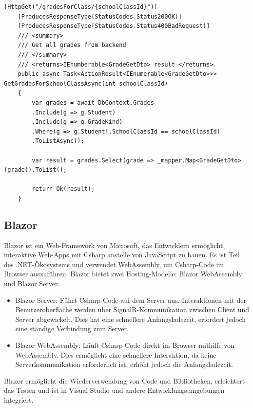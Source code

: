 \begin{lstlisting}[language={[Sharp]C}, caption=HttpGetMethod, label=lst:imp:httpGetMethod]
    [HttpGet("/gradesForClass/{schoolClassId}")]
    [ProducesResponseType(StatusCodes.Status200OK)]
    [ProducesResponseType(StatusCodes.Status400BadRequest)]
    /// <summary>
    /// Get all grades from backend
    /// </summary>
    /// <returns>IEnumberable<GradeGetDto> result </returns>
    public async Task<ActionResult<IEnumerable<GradeGetDto>>> GetGradesForSchoolClassAsync(int schoolClassId)
    {
        var grades = await DbContext.Grades
        .Include(g => g.Student)
        .Include(g => g.GradeKind)
        .Where(g => g.Student!.SchoolClassId == schoolClassId)
        .ToListAsync();
        
        var result = grades.Select(grade => _mapper.Map<GradeGetDto>(grade)).ToList();

        return Ok(result);
    }
\end{lstlisting}



\newpage

\subsection{Blazor}

Blazor ist ein Web-Framework von Microsoft, das Entwicklern ermöglicht, interaktive Web-Apps mit Csharp
 anstelle von JavaScript zu bauen. Es ist Teil des .NET-Ökosystems und verwendet WebAssembly, um Csharp-Code im Browser auszuführen. Blazor bietet zwei Hosting-Modelle: Blazor WebAssembly und Blazor Server.

\begin{itemize}
    \item Blazor Server: 
    Führt Csharp-Code auf dem Server aus. Interaktionen mit der Benutzeroberfläche werden über SignalR-Kommunikation zwischen Client und Server abgewickelt. Dies hat eine schnellere Anfangsladezeit, erfordert jedoch eine ständige Verbindung zum Server.
    \item Blazor WebAssembly: Läuft Csharp-Code direkt im Browser mithilfe von WebAssembly. Dies ermöglicht eine schnellere Interaktion, da keine Serverkommunikation erforderlich ist, erhöht jedoch die Anfangsladezeit.
\end{itemize}

Blazor ermöglicht die Wiederverwendung von Code und Bibliotheken, erleichtert das Testen und ist in Visual Studio und andere Entwicklungsumgebungen integriert.
\newpage
